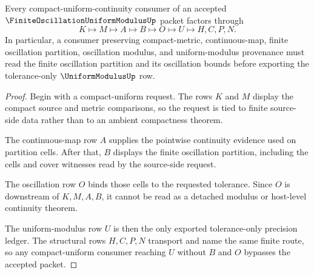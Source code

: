 \begin{theorem}
\label{thm:finite-oscillation-uniform-modulus-compact-handoff}
Every compact-uniform-continuity consumer of an accepted $\FiniteOscillationUniformModulusUp$ packet factors through
$$
K \longmapsto M \longmapsto A \longmapsto B \longmapsto O \longmapsto U \longmapsto H,C,P,N .
$$
In particular, a consumer preserving compact-metric, continuous-map, finite oscillation partition, oscillation modulus, and uniform-modulus provenance must read the finite oscillation partition and its oscillation bounds before exporting the tolerance-only $\UniformModulusUp$ row.
\end{theorem}
\begin{proof}
Begin with a compact-uniform request. The rows $K$ and $M$ display the compact source and metric comparisons, so the request is tied to finite source-side data rather than to an ambient compactness theorem.

The continuous-map row $A$ supplies the pointwise continuity evidence used on partition cells. After that, $B$ displays the finite oscillation partition, including the cells and cover witnesses read by the source-side request.

The oscillation row $O$ binds those cells to the requested tolerance. Since $O$ is downstream of $K,M,A,B$, it cannot be read as a detached modulus or host-level continuity theorem.

The uniform-modulus row $U$ is then the only exported tolerance-only precision ledger. The structural rows $H,C,P,N$ transport and name the same finite route, so any compact-uniform consumer reaching $U$ without $B$ and $O$ bypasses the accepted packet.
\end{proof}



